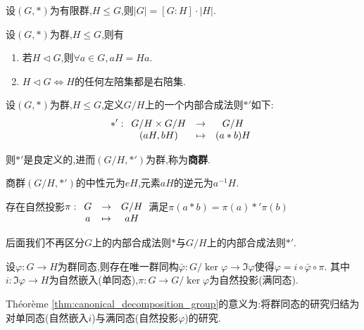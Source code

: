 \begin{thm}[Lagrange]
    设$(G, *)$为有限群,$H \leqslant G$,则$\lvert G \rvert = [G : H] \cdot \lvert H \rvert$.
\end{thm}

\begin{prop}
    设$(G, *)$为群,$H \leqslant G$,则有
    \begin{enumerate}
        \item 若$H \lhd G$,则$\forall a \in G, aH = Ha$.
        \item $H \lhd G \iff H$的任何左陪集都是右陪集.
    \end{enumerate}
\end{prop}

\begin{prop}
    设$(G, *)$为群,$H \leqslant G$,定义$G / H$上的一个内部合成法则$*'$如下:
    \[ *': \begin{array}[t]{ccc} G / H \times G / H & \to & G / H \\ (aH, bH) & \mapsto & (a * b)H \end{array} \]
    
    则$*'$是良定义的,进而$(G / H, *')$为群,称为\textbf{商群}.
\end{prop}

\begin{prop}
    商群$(G / H, *')$的中性元为$eH$,元素$aH$的逆元为$a^{-1}H$.
\end{prop}

\begin{prop}
    存在自然投影$\pi: \begin{array}[t]{ccc} G & \to & G / H \\ a & \mapsto & aH \end{array}$满足$\pi(a * b) = \pi(a) *' \pi(b)$
\end{prop}

\begin{rqq}
    后面我们不再区分$G$上的内部合成法则$*$与$G / H$上的内部合成法则$*'$.
\end{rqq}

\begin{thm}[典范分解定理]\label{thm:canonical_decomposition_group}
    设$\varphi: G \to H$为群同态,则存在唯一群同构$\bar{\varphi}: G / \ker \varphi \to \Im \varphi$使得$\varphi = i \circ \bar{\varphi} \circ \pi$.
    其中$i: \Im \varphi \to H$为自然嵌入(单同态),$\pi: G \to G / \ker \varphi$为自然投影(满同态).
\end{thm}

\begin{rqq}
    Théorème \ref{thm:canonical_decomposition_group}的意义为:将群同态的研究归结为对单同态(自然嵌入$i$)与满同态(自然投影$\varphi$)的研究.
\end{rqq}

